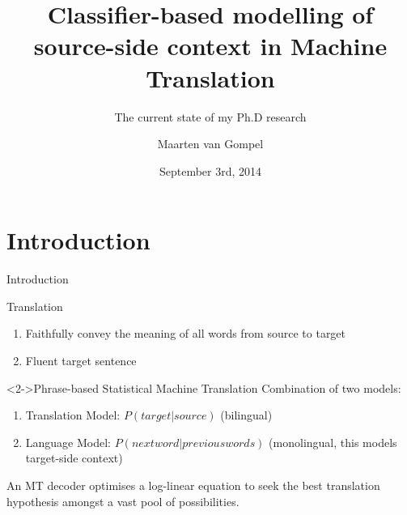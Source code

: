 \documentclass[compress]{beamer}
\title{Classifier-based modelling of source-side context in Machine Translation}
\subtitle{The current state of my Ph.D research}
\author{Maarten van Gompel}
\institute{Centre for Language Studies, Radboud University Nijmegen}
\date{September 3rd, 2014}
\begin{document}
\begin{frame}
\maketitle
\end{frame}

\section{Introduction}


\begin{frame}{Introduction}


  \begin{block}{Translation}
    \begin{enumerate}
      \item Faithfully convey the meaning of all words from source to target
      \item Fluent target sentence
    \end{enumerate}
  \end{block}

  \begin{block}<2->{Phrase-based Statistical Machine Translation}
    Combination of two models:
    \begin{enumerate}
      \item Translation Model: $P(target|source)$ (bilingual)
      \item Language Model: $P(nextword|previouswords)$  (monolingual, this
        models target-side context)
    \end{enumerate}

    An MT decoder optimises a log-linear equation to seek the best translation
    hypothesis amongst a vast pool of possibilities.
  \end{block}

\end{frame}
\end{document}
